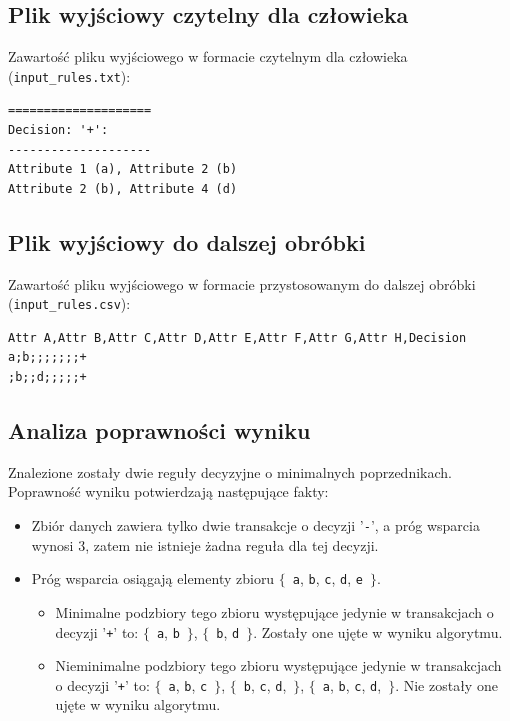 \documentclass[a4paper,10pt]{article}
\begin{document}
 \subsection{Plik wyjściowy czytelny dla człowieka}
 Zawartość pliku wyjściowego w formacie czytelnym dla człowieka (\verb+input_rules.txt+):

\begin{verbatim}
====================
Decision: '+':
--------------------
Attribute 1 (a), Attribute 2 (b)
Attribute 2 (b), Attribute 4 (d)
\end{verbatim}


 \subsection{Plik wyjściowy do dalszej obróbki}
 Zawartość pliku wyjściowego w formacie przystosowanym do dalszej obróbki (\verb+input_rules.csv+):

\begin{verbatim}
Attr A,Attr B,Attr C,Attr D,Attr E,Attr F,Attr G,Attr H,Decision
a;b;;;;;;;+
;b;;d;;;;;+
\end{verbatim}


 \subsection{Analiza poprawności wyniku}
 Znalezione zostały dwie reguły decyzyjne o minimalnych poprzednikach.
 Poprawność wyniku potwierdzają następujące fakty:
 
 \begin{itemize}
  \item Zbiór danych zawiera tylko dwie transakcje o decyzji '\verb|-|', a próg wsparcia wynosi 3, zatem nie istnieje żadna reguła dla tej decyzji.
  \item Próg wsparcia osiągają elementy zbioru $\{$~\verb+a+, \verb+b+, \verb+c+, \verb+d+, \verb+e+~$\}$.
   \begin{itemize}
    \item Minimalne podzbiory tego zbioru występujące jedynie w transakcjach o decyzji '\verb|+|' to: $\{$~\verb+a+, \verb+b+~$\}$, $\{$~\verb+b+, \verb+d+~$\}$.
    Zostały one ujęte w wyniku algorytmu.
    \item Nieminimalne podzbiory tego zbioru występujące jedynie w transakcjach o decyzji '\verb|+|' to: $\{$~\verb+a+, \verb+b+, \verb+c+~$\}$, $\{$~\verb+b+, \verb+c+, \verb+d+,~$\}$, $\{$~\verb+a+, \verb+b+, \verb+c+, \verb+d+,~$\}$.
    Nie zostały one ujęte w wyniku algorytmu.
   \end{itemize}
 
 \end{itemize}
\end{document}
